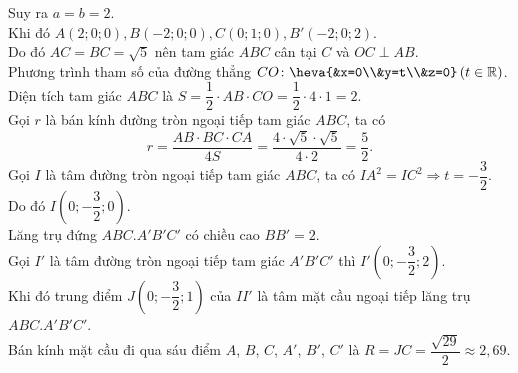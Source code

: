 \begin{bt}
{		Suy  ra $a=b=2$.\\
		Khi đó $A(2; 0; 0), B(-2; 0; 0), C(0; 1;  0), B'(-2; 0; 2)$.\\
		Do đó $AC=BC=\sqrt{5}$ nên tam giác $ABC$ cân tại $C$ và $OC  \perp AB$.\\
		Phương trình tham số của đường thẳng $CO \colon \heva{&x=0\\&y=t\\&z=0}  \left(t \in \mathbb{R}\right)$.\\
		Diện tích tam giác $ABC$  là $S=\dfrac{1}{2}\cdot AB \cdot CO= \dfrac{1}{2}\cdot4 \cdot 1=2$.\\
		Gọi $r$ là bán kính đường  tròn ngoại tiếp tam giác $ABC$, ta có
		\[r=\dfrac{AB \cdot BC  \cdot CA}{4S}=\dfrac{4\cdot \sqrt{5} \cdot \sqrt{5}}{4 \cdot 2}=\dfrac{5}{2}.\]
		Gọi $I$ là tâm đường tròn ngoại tiếp  tam giác $ABC$, ta có $IA^2=IC^2 \Rightarrow t=-\dfrac{3}{2}$.\\
		 Do đó $I\left(0; -\dfrac{3}{2}; 0\right)$.\\
		Lăng trụ đứng $ABC.A'B'C'$  có chiều cao $BB'=2$.\\
		Gọi $I'$  là tâm đường tròn ngoại tiếp tam giác $A'B'C'$ thì $I'\left(0; -\dfrac{3}{2}; 2\right)$.\\
		Khi đó trung điểm $J\left(0;  -\dfrac{3}{2}; 1\right)$ của $II'$ là tâm mặt cầu ngoại tiếp lăng trụ $ABC.A'B'C'$.\\
		Bán kính mặt cầu đi qua sáu điểm $A$, $B$, $C$, $A'$, $B'$, $C'$  là $R=JC=\dfrac{\sqrt{29}}{2} \approx 2{,}69$.
	} 
\end{bt}

